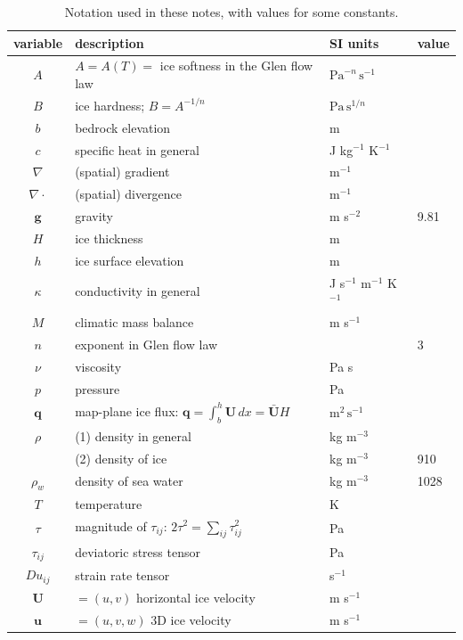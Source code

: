 \documentclass[letterpaper,final,12pt,reqno]{amsart}
\newcommand{\bq}{\mathbf{q}}
\newcommand{\bU}{\mathbf{U}}
\begin{document}
\begin{table}[ht]
\caption{Notation used in these notes, with values for some constants.}
\begin{tabular}{clll}
variable  & description & SI units & value \\
\hline
$A$ & $A=A(T)=$ ice softness in the Glen flow law & $\text{Pa}^{-n}\,\text{s}^{-1}$ \\
$B$ & ice hardness; $B=A^{-1/n}$ & $\text{Pa}\,\text{s}^{1/n}$ \\
$b$ & bedrock elevation & m \\
$c$ & specific heat in general & J kg$^{-1}$ K$^{-1}$ \\
$\nabla$ & (spatial) gradient & m$^{-1}$ \\
$\nabla\cdot$ & (spatial) divergence & m$^{-1}$ \\
$\mathbf{g}$ & gravity & m s$^{-2}$\phantom{foobar} & 9.81 \\
$H$ & ice thickness & m \\
$h$ & ice surface elevation & m \\
$\kappa$ & conductivity in general & J s$^{-1}$ m$^{-1}$ K$^{-1}$ \\
$M$ & climatic mass balance & m s$^{-1}$ \\
$n$ & exponent in Glen flow law & & 3 \\
$\nu$ & viscosity & Pa s \\
$p$ & pressure & Pa \\
$\bq$ & map-plane ice flux: $\bq = \int_{b}^{h} \bU\,dx = \bar{\bU} H$ & $\text{m}^2\,\text{s}^{-1}$ \\
$\rho$ & (1) density in general & kg m$^{-3}$ & \\
  & (2) density of ice & kg m$^{-3}$ & 910 \\
$\rho_w$ & density of sea water & kg m$^{-3}$ & 1028 \\
$T$ & temperature & K \\
$\tau$ & magnitude of $\tau_{ij}$: $2 \tau^2 = \sum_{ij} \tau_{ij}^2$ & Pa \\
$\tau_{ij}$ & deviatoric stress tensor & Pa \\
$Du_{ij}$ & strain rate tensor & s$^{-1}$ \\
$\mathbf{U}$ & $=(u,v)$ horizontal ice velocity & m s$^{-1}$ \\
$\mathbf{u}$ & $=(u,v,w)$ 3D ice velocity & m s$^{-1}$ \\
\end{tabular}
\label{tab:notation}
\end{table}
\end{document}
